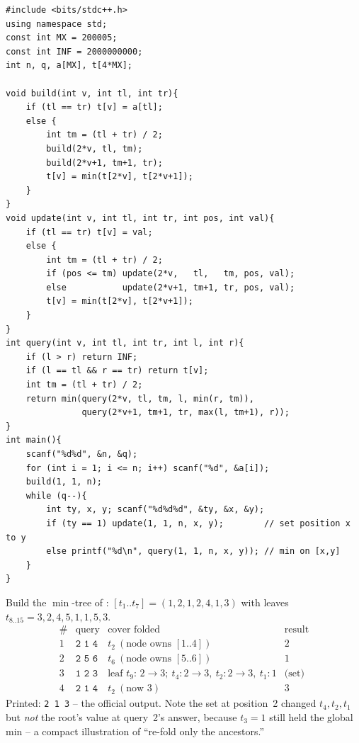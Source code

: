 \begin{lstlisting}[caption={CSES 1649 full solution (recursive min-segment-tree, point set)}, label={lst:c13-1649-soln}]
#include <bits/stdc++.h>
using namespace std;
const int MX = 200005;
const int INF = 2000000000;
int n, q, a[MX], t[4*MX];

void build(int v, int tl, int tr){
    if (tl == tr) t[v] = a[tl];
    else {
        int tm = (tl + tr) / 2;
        build(2*v, tl, tm);
        build(2*v+1, tm+1, tr);
        t[v] = min(t[2*v], t[2*v+1]);
    }
}
void update(int v, int tl, int tr, int pos, int val){
    if (tl == tr) t[v] = val;
    else {
        int tm = (tl + tr) / 2;
        if (pos <= tm) update(2*v,   tl,   tm, pos, val);
        else           update(2*v+1, tm+1, tr, pos, val);
        t[v] = min(t[2*v], t[2*v+1]);
    }
}
int query(int v, int tl, int tr, int l, int r){
    if (l > r) return INF;
    if (l == tl && r == tr) return t[v];
    int tm = (tl + tr) / 2;
    return min(query(2*v, tl, tm, l, min(r, tm)),
               query(2*v+1, tm+1, tr, max(l, tm+1), r));
}
int main(){
    scanf("%d%d", &n, &q);
    for (int i = 1; i <= n; i++) scanf("%d", &a[i]);
    build(1, 1, n);
    while (q--){
        int ty, x, y; scanf("%d%d%d", &ty, &x, &y);
        if (ty == 1) update(1, 1, n, x, y);        // set position x to y
        else printf("%d\n", query(1, 1, n, x, y)); // min on [x,y]
    }
}
\end{lstlisting}

\begin{tracebox}[CSES 1649: a=(3,2,4,5,1,1,5,3), then set position 2 to 3]
Build the \(\min\)-tree of :
\([t_1..t_7]=(1,2,1,2,4,1,3)\) with leaves \(t_{8..15}=3,2,4,5,1,1,5,3\).
\[
\renewcommand{\arraystretch}{1.15}
\begin{array}{c|l|l|l}
\text{\#} & \text{query} & \text{cover folded} & \text{result}\\ \hline
1 & \texttt{2 1 4} & t_2\ (\text{node owns }[1..4]) & 2\\
2 & \texttt{2 5 6} & t_6\ (\text{node owns }[5..6]) & 1\\
3 & \texttt{1 2 3} & \text{leaf }t_9{:}\,2{\to}3;\ t_4{:}2{\to}3,\ t_2{:}2{\to}3,\ t_1{:}1 & \text{(set)}\\
4 & \texttt{2 1 4} & t_2\ (\text{now }3) & 3
\end{array}
\]
Printed: \texttt{2 1 3} -- the official output.  Note the set at position~2
changed \(t_4,t_2,t_1\) but \emph{not} the root's value at query~2's answer,
because \(t_3=1\) still held the global min -- a compact illustration of
``re-fold only the ancestors.''
\end{tracebox}

